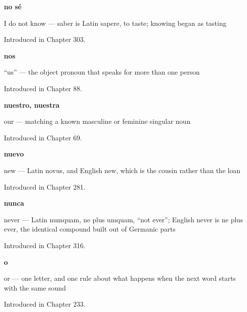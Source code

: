 \noindent\begin{minipage}[t]{\linewidth}
\raggedright
\textbf{no sé}\par
\small I do not know — saber is Latin sapere, to taste; knowing began as tasting\par
\footnotesize Introduced in Chapter 303.
\end{minipage}\par\medskip

\noindent\begin{minipage}[t]{\linewidth}
\raggedright
\textbf{nos}\par
\small \textquotedblleft{}us\textquotedblright{} — the object pronoun that speaks for more than one person\par
\footnotesize Introduced in Chapter 88.
\end{minipage}\par\medskip

\noindent\begin{minipage}[t]{\linewidth}
\raggedright
\textbf{nuestro, nuestra}\par
\small our — matching a known masculine or feminine singular noun\par
\footnotesize Introduced in Chapter 69.
\end{minipage}\par\medskip

\noindent\begin{minipage}[t]{\linewidth}
\raggedright
\textbf{nuevo}\par
\small new — Latin novus, and English new, which is the cousin rather than the loan\par
\footnotesize Introduced in Chapter 281.
\end{minipage}\par\medskip

\noindent\begin{minipage}[t]{\linewidth}
\raggedright
\textbf{nunca}\par
\small never — Latin numquam, ne plus umquam, \textquotedblleft{}not ever\textquotedblright{}; English never is ne plus ever, the identical compound built out of Germanic parts\par
\footnotesize Introduced in Chapter 316.
\end{minipage}\par\medskip

\noindent\begin{minipage}[t]{\linewidth}
\raggedright
\textbf{o}\par
\small or — one letter, and one rule about what happens when the next word starts with the same sound\par
\footnotesize Introduced in Chapter 233.
\end{minipage}\par\medskip

